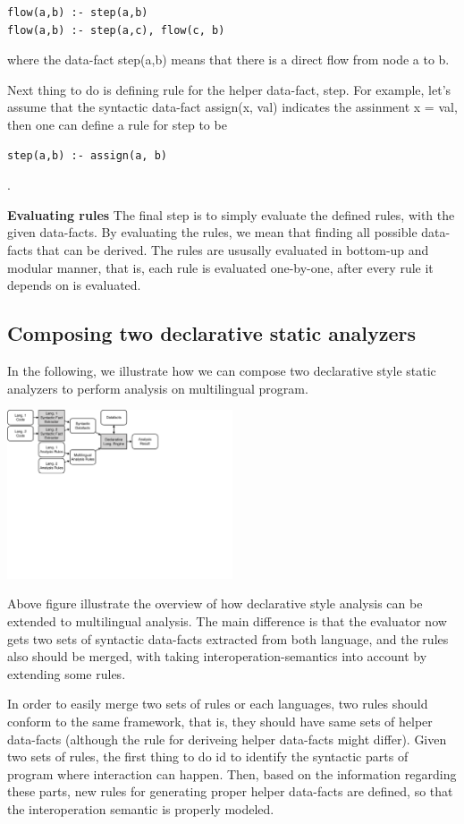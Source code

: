 \begin{lstlisting}[style=myDatalog,xleftmargin=2.5em]
flow(a,b) :- step(a,b)
flow(a,b) :- step(a,c), flow(c, b)
\end{lstlisting}
where the data-fact step(a,b) means that there is a direct flow from node a to b.

Next thing to do is defining rule for the helper data-fact, step.  For example,
let's assume that the syntactic data-fact assign(x, val) indicates the assinment
x = val, then one can define a rule for step to be
\begin{lstlisting}[style=myDatalog,xleftmargin=2.5em]
step(a,b) :- assign(a, b)
\end{lstlisting}
.


\textbf{Evaluating rules}
The final step is to simply evaluate the defined rules, with the given
data-facts.  By evaluating the rules, we mean that finding all possible
data-facts that can be derived. The rules are ususally evaluated in bottom-up
and modular manner, that is, each rule is evaluated one-by-one, after every
rule it depends on is evaluated.

\subsection{Composing two declarative static analyzers}

In the following, we illustrate how we can compose two declarative style static analyzers
to perform analysis on multilingual program.

\includegraphics[width=0.5\textwidth]{img/overview2}

Above figure illustrate the overview of how declarative style analysis can be
extended to multilingual analysis. The main difference is that the evaluator
now gets two sets of syntactic data-facts extracted from both language, and the
rules also should be merged, with taking interoperation-semantics into account by
extending some rules.

In order to easily merge two sets of rules or each languages, two rules should
conform to the same framework, that is, they should have same sets of helper
data-facts (although the rule for deriveing helper data-facts might differ).
Given two sets of rules, the first thing to do id to identify the syntactic
parts of program where interaction can happen.  Then, based on the information
regarding these parts, new rules for generating proper helper data-facts are
defined, so that the interoperation semantic is properly modeled.

